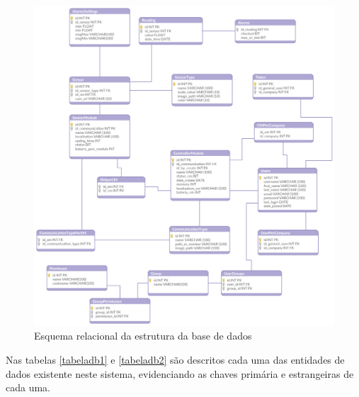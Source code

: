 \begin{figure}[!htb]
	\centering
	\includegraphics[width=\linewidth]{esquemas/database_tese.pdf}
	\caption{Esquema relacional da estrutura da base de dados}
	\label{esquemarelacional}
\end{figure}


Nas tabelas \ref{tabeladb1} e \ref{tabeladb2} são descritos cada uma das entidades de dados existente neste sistema, evidenciando as chaves primária e estrangeiras de cada uma. 



